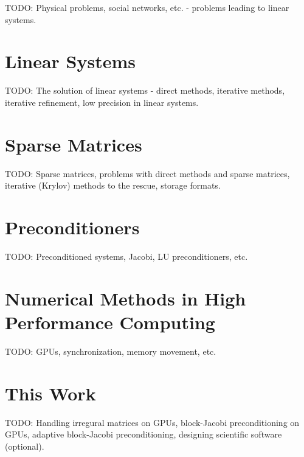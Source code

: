 TODO: Physical problems, social networks, etc. - problems leading to linear
    systems.

\section{Linear Systems}
TODO: The solution of linear systems - direct methods, iterative methods,
      iterative refinement, low precision in linear systems.

\section{Sparse Matrices}
TODO: Sparse matrices, problems with direct methods and sparse matrices,
      iterative (Krylov) methods to the rescue, storage formats.

\section{Preconditioners}
TODO: Preconditioned systems, Jacobi, LU preconditioners, etc.

\section{Numerical Methods in High Performance Computing}
TODO: GPUs, synchronization, memory movement, etc.

\section{This Work}
TODO: Handling irregural matrices on GPUs, block-Jacobi preconditioning on GPUs,
      adaptive block-Jacobi preconditioning, designing scientific software
      (optional).
